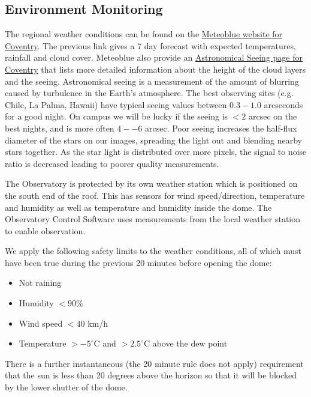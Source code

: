 \documentclass[12pt,a4paper]{article}
\begin{document}
\subsection{Environment Monitoring}

The regional weather conditions can be found on the \href{https://www.meteoblue.com/en/weather/week/coventry_united-kingdom_2652221}{Meteoblue website for Coventry}. The previous link gives a 7 day forecast with expected temperatures, rainfall and cloud cover. Meteoblue also provide an \href{https://www.meteoblue.com/en/weather/outdoorsports/seeing/coventry_united-kingdom_2652221}{Astronomical Seeing page for Coventry} that lists more detailed information about the height of the cloud layers and the seeing. Astronomical seeing is a measurement of the amount of blurring caused by turbulence in the Earth's atmosphere. The best observing sites (e.g. Chile, La Palma, Hawaii) have typical seeing values between $0.3-1.0$ arcseconds for a good night. On campus we will be lucky if the seeing is $<2$ arcsec on the best nights, and is more often $4 -- 6$ arcsec. Poor seeing increases the half-flux diameter of the stars on our images, spreading the light out and blending nearby stars together. As the star light is distributed over more pixels, the signal to noise ratio is decreased leading to poorer quality measurements. 

The Observatory is protected by its own weather station which is positioned on the south end of the roof. This has sensors for wind speed/direction, temperature and humidity as well as temperature and humidity inside the dome. The Observatory Control Software uses measurements from the local weather station to enable observation.

We apply the following safety limits to the weather conditions, all of which must have been true during the previous 20 minutes before opening the dome:

\begin{itemize}
    \item Not raining 
    \item Humidity $<90$\%
    \item Wind speed $<40$ km/h
    \item Temperature $>-5^{\circ}$C and $>2.5^{\circ}$C above the dew point
\end{itemize}

There is a further instantaneous (the 20 minute rule does not apply) requirement that the sun is less than 20 degrees above the horizon so that it will be blocked by the lower shutter of the dome.
\end{document}
